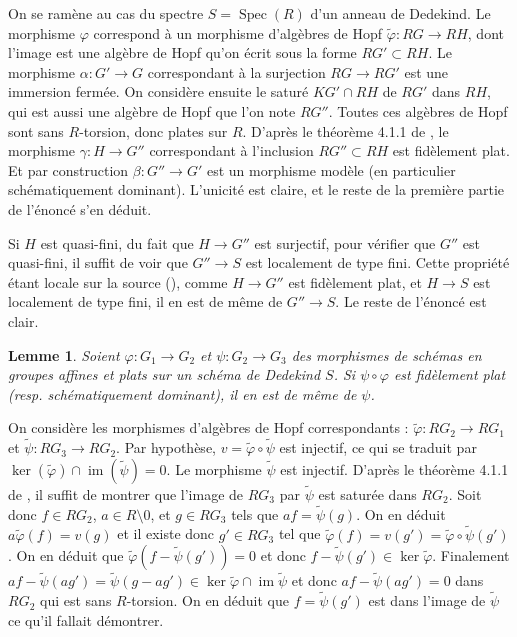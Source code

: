 \documentclass[11pt]{amsart}
\numberwithin{equation}{section}
\newtheorem{lem}[thm]{Lemme}
\theoremstyle{definition}
\theoremstyle{remark}
\DeclareMathOperator{\im}{im}
\DeclareMathOperator{\Spec}{Spec}
\begin{document}
  \proof On se ram\`ene au cas  du spectre $S = \Spec (R)$ d'un anneau de Dedekind. Le morphisme $\varphi $ correspond \`a un morphisme d'alg\`ebres de Hopf $\tilde \varphi : RG \to RH$, dont l'image est une alg\`ebre de Hopf qu'on \'ecrit sous la forme $RG' \subset RH$. Le morphisme $\alpha :G' \to G$ correspondant \`a la surjection $RG \to RG'$ est une immersion ferm\'ee. On consid\`ere ensuite le satur\'e $KG' \cap RH$ de $RG'$ dans $RH$, qui est aussi une alg\`ebre de Hopf que l'on note $RG''$. Toutes ces alg\`ebres de Hopf sont sans $R$-torsion, donc plates sur $R$. D'apr\`es le th\'eor\`eme 4.1.1 de \cite{Duong-Hai}, le morphisme $\gamma : H \to G''$ correspondant \`a l'inclusion $RG'' \subset RH$ est fid\`element plat. Et par construction $\beta : G'' \to G'$ est un morphisme mod\`ele (en particulier sch\'ematiquement dominant). L'unicit\'e est claire, et le reste de la premi\`ere partie de l'\'enonc\'e s'en d\'eduit.

Si $H$ est quasi-fini, du fait que $H \to G''$ est surjectif, pour v\'erifier que $G''$ est quasi-fini, il suffit de voir que $G'' \to S$ est localement de type fini. Cette propri\'et\'e \'etant locale sur la source (\cite[Lemma 34.25.2, Tag 036O]{ST}), comme $H \to G'' $ est fid\`element plat, et $H \to S$ est localement de type fini, il en est de m\^eme de $G'' \to S$. Le reste de l'\'enonc\'e est clair.  \endproof




 \begin{lem}\label{2} Soient $\varphi : G_1 \to G_2$ et $\psi : G_2 \to G_3$ des morphismes de sch\'emas en groupes affines et plats sur un sch\'ema de Dedekind $S$. Si $\psi \circ \varphi $ est fid\`element plat (resp. sch\'ematiquement dominant), il en est de m\^eme de $\psi$.
 \end{lem}

 \proof On consid\`ere les morphismes d'alg\`ebres de Hopf correspondants : $\tilde \varphi : RG_2 \to RG_1$ et $\tilde \psi : RG_3 \to RG_2$. Par hypoth\`ese, $v= \tilde \varphi \circ \tilde \psi$ est injectif, ce qui se traduit par $\ker (\tilde \varphi ) \cap \im (\tilde \psi )=0$. Le morphisme $\tilde \psi$ est injectif. D'apr\`es le th\'eor\`eme 4.1.1 de \cite{Duong-Hai}, il suffit de montrer que l'image de $RG_3 $ par $\tilde \psi$ est satur\'ee dans $RG_2$. Soit donc $f \in RG_2$, $a \in R\setminus 0$, et $g \in RG_3$ tels que $af= \tilde \psi (g)$. On en d\'eduit $a\tilde \varphi (f)= v(g)$ et il existe donc $g' \in RG_3$ tel que $\tilde \varphi (f)= v(g')= \tilde \varphi \circ \tilde \psi (g')$. On en d\'eduit que $\tilde \varphi ( f-\tilde \psi (g'))=0$ et donc $f-\tilde \psi (g') \in \ker \tilde \varphi $. Finalement $af- \tilde \psi (ag ')= \tilde \psi (g-ag')\in \ker \tilde \varphi \cap \im \tilde \psi$ et donc $af- \tilde \psi (ag ')=0$ dans $RG_2$ qui est sans $R$-torsion. On en d\'eduit que $f= \tilde \psi (g')$ est dans l'image de $\tilde \psi$ ce qu'il fallait d\'emontrer.
 \endproof
\end{document}
